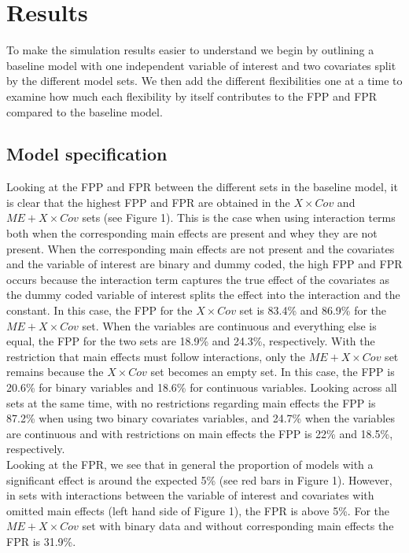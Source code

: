 \section{Results} 
To make the simulation results easier to understand we begin by outlining a baseline model with one independent  variable of interest and two covariates split by the different model sets. We then add the different flexibilities one at a time to examine how much each flexibility by itself contributes to the FPP and FPR compared to the baseline model.

\subsection{Model specification}
Looking at the FPP and FPR between the different sets in the baseline model, it is clear that the highest FPP and FPR are obtained in the $X \times Cov$ and $ME + X \times Cov$ sets (see Figure 1). This is the case when using interaction terms both when the corresponding main effects are present and whey they are not present. When the corresponding main effects are not present and the covariates and the variable of interest are binary and dummy coded, the high FPP and FPR occurs because the interaction term  captures the true effect of the covariates as the dummy coded variable of interest splits the effect into the interaction and the constant. In this case, the FPP for the $X \times Cov$ set is 83.4\% and 86.9\% for the $ME + X \times Cov$ set. When the variables are continuous and everything else is equal, the FPP for the two sets are 18.9\% and 24.3\%, respectively. With the restriction that main effects must follow interactions, only the $ME + X \times Cov$ set remains because the $X \times Cov$ set becomes an empty set. In this case, the FPP is 20.6\% for binary variables and 18.6\% for continuous variables. Looking across all sets at the same time, with no restrictions regarding main effects the FPP is 87.2\% when using two binary covariates variables, and 24.7\% when the variables are continuous and with restrictions on main effects the FPP is 22\% and 18.5\%, respectively.\\ 
Looking at the FPR, we see that in general the proportion of models with a significant effect is around the expected 5\%  (see red bars in Figure 1). However, in sets with interactions between the variable of interest and covariates with omitted main effects (left hand side of Figure 1), the FPR is above 5\%. For the $ME + X \times Cov$ set with binary data and without corresponding main effects the FPR is 31.9\%. \\

